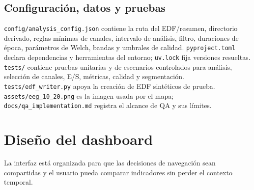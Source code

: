 \documentclass[11pt,a4paper]{article}
\begin{document}
\subsection{Configuración, datos y pruebas}
\texttt{config/analysis\_config.json} contiene la ruta del EDF/resumen, directorio derivado, reglas mínimas de canales, intervalo de análisis, filtro, duraciones de época, parámetros de Welch, bandas y umbrales de calidad. \texttt{pyproject.toml} declara dependencias y herramientas del entorno; \texttt{uv.lock} fija versiones resueltas. \texttt{tests/} contiene pruebas unitarias y de escenarios controlados para análisis, selección de canales, E/S, métricas, calidad y segmentación. \texttt{tests/edf\_writer.py} apoya la creación de EDF sintéticos de prueba. \texttt{assets/eeg\_10\_20.png} es la imagen usada por el mapa; \texttt{docs/qa\_implementation.md} registra el alcance de QA y sus límites.

\section{Diseño del dashboard}
La interfaz está organizada para que las decisiones de navegación sean compartidas y el usuario pueda comparar indicadores sin perder el contexto temporal.
\end{document}
